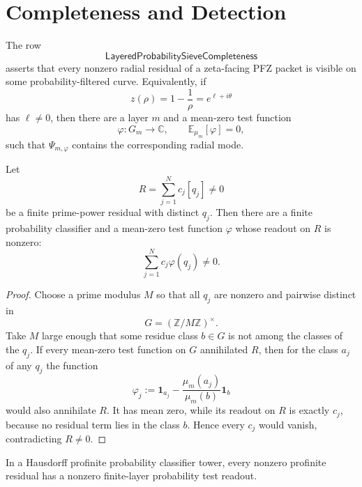 \section{Completeness and Detection}
\label{sec:rh-layered-prime-probability-completeness}

\begin{definition}
\label{def:rh-layered-probability-sieve-completeness}
The row
$$
\mathsf{LayeredProbabilitySieveCompleteness}
$$
asserts that every nonzero radial residual of a zeta-facing PFZ packet
is visible on some probability-filtered curve.  Equivalently, if
$$
z(\rho)=1-\frac1\rho=e^{\ell+i\theta}
$$
has $\ell\ne0$, then there are a layer $m$ and a mean-zero test function
$$
\varphi:G_m\to\mathbb C,
\qquad
\mathbb E_{\mu_m}[\varphi]=0,
$$
such that $\Psi_{m,\varphi}$ contains the corresponding radial mode.
\end{definition}

\begin{theorem}
\label{thm:rh-finite-residuals-detected-by-probability-tests}
Let
$$
R=\sum_{j=1}^{N}c_j[q_j]\ne0
$$
be a finite prime-power residual with distinct $q_j$.  Then there are a
finite probability classifier and a mean-zero test function $\varphi$
whose readout on $R$ is nonzero:
$$
\sum_{j=1}^{N}c_j\varphi(q_j)\ne0.
$$
\end{theorem}

\begin{proof}
Choose a prime modulus $M$ so that all $q_j$ are nonzero and pairwise
distinct in
$$
G=(\mathbb Z/M\mathbb Z)^\times.
$$
Take $M$ large enough that some residue class $b\in G$ is not among the
classes of the $q_j$.  If every mean-zero test function on $G$
annihilated $R$, then for the class $a_j$ of any $q_j$ the function
$$
\varphi_j
:=
\mathbf 1_{a_j}
-
\frac{\mu_m(a_j)}{\mu_m(b)}\mathbf 1_b
$$
would also annihilate $R$.  It has mean zero, while its readout on $R$
is exactly $c_j$, because no residual term lies in the class $b$.  Hence
every $c_j$ would vanish, contradicting $R\ne0$.
\end{proof}

\begin{theorem}
\label{thm:rh-profinite-probability-residuals-descend}
In a Hausdorff profinite probability classifier tower, every nonzero
profinite residual has a nonzero finite-layer probability test readout.
\end{theorem}

